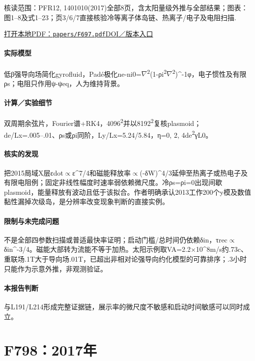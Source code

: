 \textsf{核读范围：}PFR12, 1401010(2017)全部8页，含太阳量级外推与全部结果；\textsf{图表：}图1–8及式1–23；页3/6/7直接核验冷等离子体岛链、热离子/电子及电阻扫描.

\href{run:papers/F697.pdf}{打开本地PDF：\texttt{papers/F697.pdf}}\quad\href{https://doi.org/10.1585/pfr.12.1401010}{DOI／版本入口}

\paragraph{实际模型}低β强导向场简化gyrofluid，Padé极化ne-ni0=\ensuremath{\nabla}\textsuperscript{2}(1-ρi\textsuperscript{2}\ensuremath{\nabla}\textsuperscript{2})\textasciicircum{}-1φ，电子惯性及有限ρs；电阻只作用ψ-ψeq，人为维持背景。

\paragraph{计算／实验细节}双周期余弦片，Fourier谱+RK4，4096\textsuperscript{2}并以8192\textsuperscript{2}复核plasmoid；de/Lx=.005–.01、ρs或ρi同阶，Ly/Lx=5.24/5.84，η=0, 2, 4de\textsuperscript{2}γL0。

\paragraph{核实的发现}把2015局域X层εdot\ensuremath{\propto}ε\textasciicircum{}7/4和磁能释放率\ensuremath{\propto}(-δW)\textasciicircum{}4/3延伸至热离子或热电子及有限电阻例；固定非线性幅度时速率弱依赖微尺度。冷ρs=ρi=0出现间歇plasmoid，能量释放有波动且低于该拟合。作者明确承认2013工作200个y模及数值黏性漏掉次级岛，是分辨率改变现象判断的直接实例。

\paragraph{限制与未完成问题}不是全部四参数扫描或普适最快率证明；启动门槛/总时间仍依赖δin，τrec\ensuremath{\propto}δin\textasciicircum{}-3/4。磁能大部转为流能不等于加热。太阳示例取VA=2.2×10\textasciicircum{}8m/s约.73c、重联场.1T大于导向场.01T，已超出非相对论强导向约化模型的可靠排序；.3小时只能作为示意外推，非观测验证。

\paragraph{本报告判断}与L191/L214形成完整证据链，展示率的微尺度不敏感和启动时间敏感可以同时成立。

\section{F798：2017年}\label{paper:F798}

